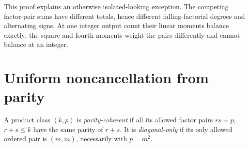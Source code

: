 \documentclass[11pt,a4paper]{article}
\numberwithin{equation}{section}
\theoremstyle{definition}
\theoremstyle{remark}
\begin{document}
This proof explains an otherwise isolated-looking exception. The competing
factor-pair sums have different totals, hence different falling-factorial
degrees and alternating signs. At one integer output count their linear
moments balance exactly; the square and fourth moments weight the pairs
differently and cannot balance at an integer.

\section{Uniform noncancellation from parity}\label{sc:sec:parity}

\begin{definition}
A product class $(k,p)$ is \emph{parity-coherent} if all its allowed
factor pairs $rs=p$, $r+s\le k$ have the same parity of $r+s$.
It is \emph{diagonal-only} if its only allowed ordered pair is $(m,m)$,
necessarily with $p=m^2$.
\end{definition}
\end{document}
